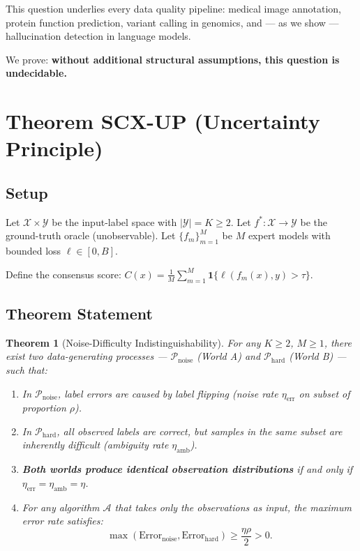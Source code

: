 \documentclass[12pt,a4paper]{article}
\newtheorem{theorem}{Theorem}[section]
\theoremstyle{definition}
\theoremstyle{remark}
\begin{document}
This question underlies every data quality pipeline: medical image annotation, protein function prediction, variant calling in genomics, and — as we show — hallucination detection in language models.

We prove: \textbf{without additional structural assumptions, this question is undecidable.}

\section{Theorem SCX-UP (Uncertainty Principle)}

\subsection{Setup}

Let $\mathcal{X} \times \mathcal{Y}$ be the input-label space with $|\mathcal{Y}| = K \geq 2$. Let $f^*: \mathcal{X} \to \mathcal{Y}$ be the ground-truth oracle (unobservable). Let $\{f_m\}_{m=1}^M$ be $M$ expert models with bounded loss $\ell \in [0, B]$.

Define the consensus score: $C(x) = \frac{1}{M} \sum_{m=1}^M \mathbf{1}\{\ell(f_m(x), y) > \tau\}$.

\subsection{Theorem Statement}

\begin{theorem}[Noise-Difficulty Indistinguishability]
\label{thm:scx-up}
For any $K \geq 2$, $M \geq 1$, there exist two data-generating processes — $\mathcal{P}_{\text{noise}}$ (World A) and $\mathcal{P}_{\text{hard}}$ (World B) — such that:
\begin{enumerate}
\item In $\mathcal{P}_{\text{noise}}$, label errors are caused by label flipping (noise rate $\eta_{\text{err}}$ on subset of proportion $\rho$).
\item In $\mathcal{P}_{\text{hard}}$, all observed labels are correct, but samples in the same subset are inherently difficult (ambiguity rate $\eta_{\text{amb}}$).
\item \textbf{Both worlds produce identical observation distributions} if and only if $\eta_{\text{err}} = \eta_{\text{amb}} = \eta$.
\item For any algorithm $\mathcal{A}$ that takes only the observations as input, the maximum error rate satisfies:
\begin{equation}
\max(\text{Error}_{\text{noise}}, \text{Error}_{\text{hard}}) \geq \frac{\eta\rho}{2} > 0.
\end{equation}
\end{enumerate}
\end{theorem}
\end{document}
